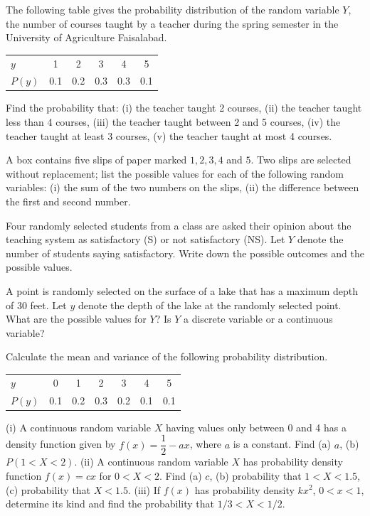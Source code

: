 \documentclass[11pt,a4paper]{article}
\begin{document}
\begin{longlist}
\item The following table gives the probability distribution of the random variable $Y$, the number of courses taught by a teacher during the spring semester in the University of Agriculture Faisalabad.
\begin{center}
\begin{tabular}{l ccccc}
\toprule
$y$ & 1 & 2 & 3 & 4 & 5 \\
$P(y)$ & 0.1 & 0.2 & 0.3 & 0.3 & 0.1 \\
\bottomrule
\end{tabular}
\end{center}
Find the probability that: (i) the teacher taught 2 courses, (ii) the teacher taught less than 4 courses, (iii) the teacher taught between 2 and 5 courses, (iv) the teacher taught at least 3 courses, (v) the teacher taught at most 4 courses.

\item A box contains five slips of paper marked $1,2,3,4$ and $5$. Two slips are selected without replacement; list the possible values for each of the following random variables: (i) the sum of the two numbers on the slips, (ii) the difference between the first and second number.

\item Four randomly selected students from a class are asked their opinion about the teaching system as satisfactory (S) or not satisfactory (NS). Let $Y$ denote the number of students saying satisfactory. Write down the possible outcomes and the possible values.

\item A point is randomly selected on the surface of a lake that has a maximum depth of 30 feet. Let $y$ denote the depth of the lake at the randomly selected point. What are the possible values for $Y$? Is $Y$ a discrete variable or a continuous variable?

\item Calculate the mean and variance of the following probability distribution.
\begin{center}
\begin{tabular}{l cccccc}
\toprule
$y$ & 0 & 1 & 2 & 3 & 4 & 5 \\
$P(y)$ & 0.1 & 0.2 & 0.3 & 0.2 & 0.1 & 0.1 \\
\bottomrule
\end{tabular}
\end{center}

\item (i) A continuous random variable $X$ having values only between 0 and 4 has a density function given by $f(x)=\dfrac{1}{2}-ax$, where $a$ is a constant. Find (a) $a$, (b) $P(1<X<2)$. (ii) A continuous random variable $X$ has probability density function $f(x)=cx$ for $0<X<2$. Find (a) $c$, (b) probability that $1<X<1.5$, (c) probability that $X<1.5$. (iii) If $f(x)$ has probability density $kx^2$, $0<x<1$, determine its kind and find the probability that $1/3<X<1/2$.


\end{longlist}
\end{document}

